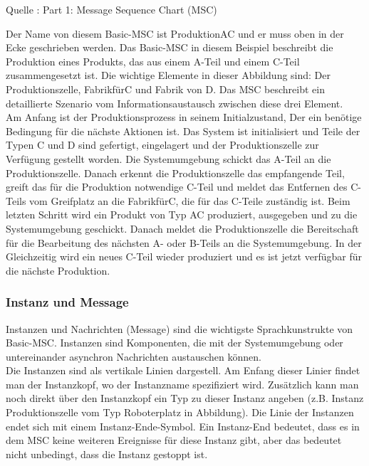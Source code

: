 

Quelle : \cite{MT009}
Part 1: Message Sequence Chart (MSC) 

 

Der Name von diesem Basic-MSC ist ProduktionAC und er muss oben in der Ecke geschrieben werden. Das Basic-MSC in diesem Beispiel beschreibt die Produktion eines Produkts, das aus einem A-Teil und einem C-Teil zusammengesetzt ist.
Die wichtige Elemente in dieser Abbildung sind: Der Produktionszelle, FabrikfürC und Fabrik von D. Das MSC beschreibt ein detaillierte Szenario vom Informationsaustausch zwischen diese drei Element.\\

Am Anfang ist der Produktionsprozess in seinem Initialzustand, Der ein benötige Bedingung für die nächste Aktionen ist. 
 Das System ist initialisiert und Teile
der Typen C und D sind gefertigt, eingelagert und der
Produktionszelle zur Verfügung gestellt worden.
 Die Systemumgebung schickt das A-Teil an die Produktionszelle.
 Danach erkennt die Produktionszelle das empfangende Teil, greift das für die Produktion notwendige C-Teil und meldet das Entfernen des
 C-Teils vom Greifplatz an die FabrikfürC, die für das C-Teile zuständig ist. 
 Beim letzten Schritt wird ein Produkt von Typ AC produziert, ausgegeben und zu die Systemumgebung geschickt.
Danach meldet die Produktionszelle die Bereitschaft
für die Bearbeitung des nächsten A- oder B-Teils
an die Systemumgebung.
In der Gleichzeitig wird ein neues C-Teil wieder produziert und es ist jetzt verfügbar für die nächste Produktion.

\subsubsection{Instanz und Message}
Instanzen und Nachrichten (Message) sind die wichtigste Sprachkunstrukte von Basic-MSC.
Instanzen sind Komponenten, die mit der Systemumgebung oder untereinander
asynchron Nachrichten austauschen können.\\
Die Instanzen sind als vertikale Linien dargestell. Am Enfang dieser Linier findet man der Instanzkopf, wo der Instanzname spezifiziert wird. Zusätzlich kann man noch direkt über den Instanzkopf ein Typ zu dieser Instanz angeben (z.B. Instanz Produktionszelle vom Typ Roboterplatz in Abbildung).
Die Linie der Instanzen endet sich mit einem Instanz-Ende-Symbol. Ein Instanz-End bedeutet, dass es in dem MSC keine weiteren Ereignisse für diese Instanz gibt, aber das bedeutet nicht unbedingt, dass die Instanz gestoppt ist.\\


